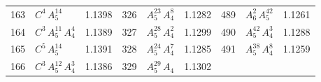 \begin{longtable}{@{}rlr@{\quad}rlr@{\quad}rlr@{}}
163 & $C^{4}$\,$A_{5}^{14}$ & 1.1398 & 326 & $A_{5}^{23}$\,$A_{4}^{8}$ & 1.1282 & 489 & $A_{6}^{2}$\,$A_{5}^{42}$ & 1.1261 \\
164 & $C^{3}$\,$A_{5}^{11}$\,$A_{4}^{4}$ & 1.1389 & 327 & $A_{5}^{28}$\,$A_{4}^{2}$ & 1.1299 & 490 & $A_{5}^{42}$\,$A_{4}^{3}$ & 1.1288 \\
165 & $C^{5}$\,$A_{5}^{14}$ & 1.1391 & 328 & $A_{5}^{24}$\,$A_{4}^{7}$ & 1.1285 & 491 & $A_{5}^{38}$\,$A_{4}^{8}$ & 1.1259 \\
166 & $C^{3}$\,$A_{5}^{12}$\,$A_{4}^{3}$ & 1.1386 & 329 & $A_{5}^{29}$\,$A_{4}$ & 1.1302 & & & \\
\bottomrule
\end{longtable}
